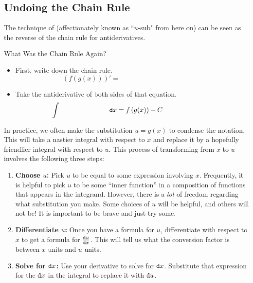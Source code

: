 \subsection{Undoing the Chain Rule}\label{undo}
The technique of  (affectionately known as ``$u$-sub" from here on) can be seen as the reverse of the chain rule for antiderivatives.

\begin{exercise}{What Was the Chain Rule Again? \Coffeecup }
\begin{itemize}
\item First, write down the chain rule. $$\left(f\left(g(x)\right)\right)'= \hspace{2in} $$ 

\item Take the antiderivative of both sides of that equation.  $$\int \hspace{1in} \mathop{}\!\mathtt{d} x= f\left(g(x)\right)+C \hspace{1in} $$
\end{itemize}
\end{exercise}
%
In practice, we often make the substitution $u=g(x)$ to condense the notation.  This will take a nastier integral with respect to $x$ and replace it by a hopefully friendlier integral with respect to $u$.  This process of transforming from $x$ to $u$ involves the following three steps: 
%
\begin{enumerate}
\item {\bf Choose $u$:} Pick $u$ to be equal to some expression involving $x$. Frequently, it is helpful to pick $u$ to be some ``inner function'' in a composition of functions that appears in the integrand.  However, there is a \emph{lot} of freedom regarding what substitution you make.  Some choices of $u$ will be helpful, and others will not be!  It is important to be brave and just try some.
\item {\bf Differentiate $u$:} Once you have a formula for $u$, differentiate with respect to $x$ to get a formula for $\frac{\mathop{}\!\mathtt{d} u}{\mathop{}\!\mathtt{d} x}$.  This will tell us what the conversion factor is between $x$ units and $u$ units.
\item {\bf Solve for $\mathop{}\!\mathtt{d} x$:} Use your derivative to solve for $\mathop{}\!\mathtt{d} x$.  Substitute that expression for the $\mathop{}\!\mathtt{d} x$ in the integral to replace it with $\mathop{}\!\mathtt{d} u$.
\end{enumerate}

